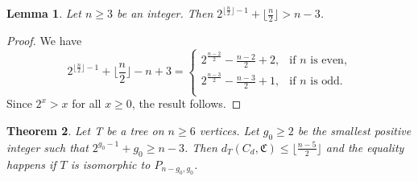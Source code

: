 \documentclass[10pt,a4paper]{amsart}
\newtheorem{theorem}{Theorem}[section]
\newtheorem{lemma}[theorem]{Lemma}
\begin{document}
\begin{lemma}\label{lem:cd}
Let $n\geq 3$ be an integer.  Then $2^{\lfloor\frac{n}{2}\rfloor-1}+\lfloor\frac{n}{2}\rfloor> n-3$.
\end{lemma}
\begin{proof}
We have 
$$2^{\lfloor\frac{n}{2}\rfloor-1}+\lfloor \frac{n}{2} \rfloor - n + 3= \left\{
\begin{array}{ll}
  2^{\frac{n-2}{2}}-\frac{n-2}{2}+2 ,  &\text{if $n$ is even,}\\
  2^{\frac{n-3}{2}}-\frac{n-3}{2}+1, &\text{if $n$ is odd.}\\
\end{array}
\right.$$
Since $2^x>x$ for all $x\geq 0$, the result follows.
\end{proof}
\begin{theorem}\label{thm:cd2}
Let T be a tree on $n\geq 6$ vertices. Let $g_0\geq 2$ be the smallest positive integer such that $2^{g_0-1}+g_0\geq n-3$. Then  $d_T(C_d,\mathfrak{C})\leq \lfloor \frac{n-5}{2} \rfloor$ and the equality happens if $T$ is isomorphic to $P_{n-g_0,g_0}$.
\end{theorem}
\end{document}
